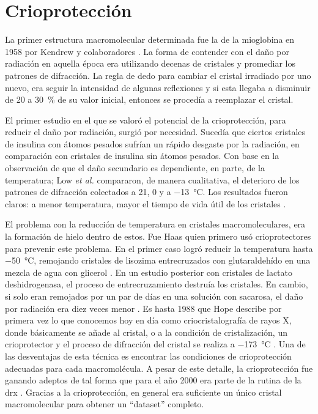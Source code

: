 \section{Crioprotección}
La primer estructura macromolecular determinada fue la de la mioglobina en 1958 por Kendrew y colaboradores . La forma de contender con el daño por radiación en aquella época era utilizando decenas de cristales y promediar los patrones de difracción. La regla de dedo para cambiar el cristal irradiado por uno nuevo, era seguir la intensidad de algunas reflexiones y si esta llegaba a disminuir de \num{20} a \SI{30}{\percent} de su valor inicial, entonces se procedía a reemplazar el cristal. 

El primer estudio en el que se valoró el potencial de la crioprotección, para reducir el daño por radiación, surgió por necesidad. Sucedía que ciertos cristales de insulina con átomos pesados sufrían un rápido desgaste por la radiación, en comparación con cristales de insulina sin átomos pesados. Con base en la observación de que el daño secundario es dependiente, en parte, de la temperatura; Low \emph{et al.} compararon, de manera cualitativa, el deterioro de los patrones de difracción colectados a \num{21}, \num{0} y a \SI{-13}{\celsius}. Los resultados fueron claros: a menor temperatura, mayor el tiempo de vida útil de los cristales  . 

El problema con la reducción de temperatura en cristales macromoleculares, era la formación de hielo dentro de estos. Fue Haas quien primero usó crioprotectores para prevenir este problema. En el primer caso logró reducir la temperatura hasta \SI{-50}{\celsius}, remojando cristales de lisozima entrecruzados con glutaraldehído
en una mezcla de agua con glicerol . En un estudio posterior con cristales de lactato deshidrogenasa, el proceso de entrecruzamiento destruía los cristales. En cambio, si solo eran remojados por un par de días en una solución con sacarosa, el daño por radiación era diez veces menor . 
Es hasta 1988 que Hope describe por primera vez lo que conocemos hoy en día como criocristalografía de rayos X, donde básicamente se añade al cristal, o a la condición de cristalización, un crioprotector y el proceso de difracción del cristal se realiza a \SI{-173}{\celsius} . Una de las desventajas de esta técnica es encontrar las condiciones de crioprotección adecuadas para cada macromolécula. A pesar de este detalle, la crioprotección fue ganando adeptos de tal forma
que para el año 2000 era parte de la rutina de la \acrshort{drx} . Gracias a la crioprotección, en general era suficiente un único cristal macromolecular para obtener un
\enquote{dataset} completo.

